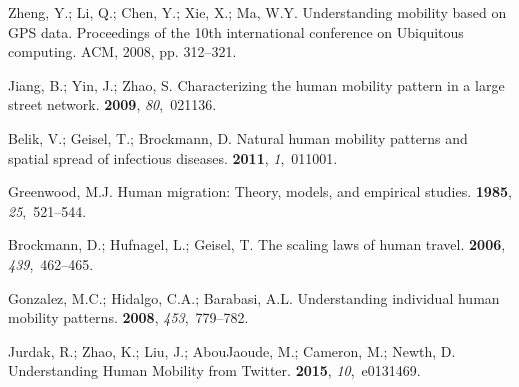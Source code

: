 \documentclass[ijgi,article,accept,moreauthors,pdftex,10pt,a4paper]{mdpi}
\theoremstyle{mdpi}
\newcounter{ex}
\newcounter{re}
\theoremstyle{mdpidefinition}
\begin{document}


\renewcommand\bibname{References}
\begin{thebibliography}{-------}
\providecommand{\natexlab}[1]{#1}

Zheng, Y.; Li, Q.; Chen, Y.; Xie, X.; Ma, W.Y.
\newblock Understanding mobility based on GPS data.
\newblock  Proceedings of the 10th international conference on Ubiquitous
  computing. ACM,  2008, pp. 312--321.

Jiang, B.; Yin, J.; Zhao, S.
\newblock Characterizing the human mobility pattern in a large street network.
 {\bf 2009}, {\em 80},~021136.

Belik, V.; Geisel, T.; Brockmann, D.
\newblock Natural human mobility patterns and spatial spread of infectious
  diseases.
 {\bf 2011}, {\em 1},~011001.

Greenwood, M.J.
\newblock Human migration: Theory, models, and empirical studies.
 {\bf 1985}, {\em 25},~521--544.

Brockmann, D.; Hufnagel, L.; Geisel, T.
\newblock The scaling laws of human travel.
 {\bf 2006}, {\em 439},~462--465.

Gonzalez, M.C.; Hidalgo, C.A.; Barabasi, A.L.
\newblock Understanding individual human mobility patterns.
 {\bf 2008}, {\em 453},~779--782.

Jurdak, R.; Zhao, K.; Liu, J.; AbouJaoude, M.; Cameron, M.; Newth, D.
\newblock Understanding Human Mobility from Twitter.
 {\bf 2015}, {\em 10},~e0131469.


\end{thebibliography}
\end{document}
